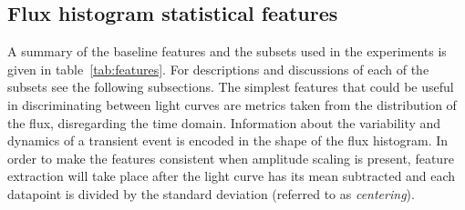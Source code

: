 	

	

	\subsection{Flux histogram statistical features}
	
	A summary of the baseline features and the subsets used in the experiments is given in table~\ref{tab:features}. For descriptions and discussions of each of the subsets see the following subsections. 
	The simplest features that could be useful in discriminating between light curves are metrics taken from the distribution of the flux, disregarding the time domain. Information about the variability and dynamics of a transient event is encoded in the shape of the flux histogram. In order to make the features consistent when amplitude scaling is present, feature extraction will take place after the light curve has its mean subtracted and each datapoint is divided by the standard deviation (referred to as \emph{centering}).
	
